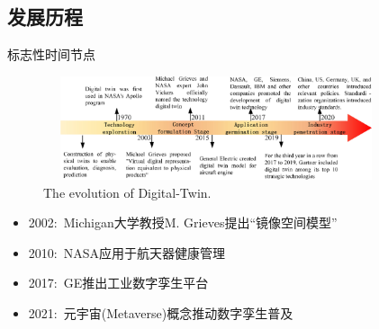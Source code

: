 \subsection{发展历程}
\begin{frame}{标志性时间节点}
\begin{figure}[h!]
\centering
     \includegraphics[height=1.2in, width=4.0in, viewport=0 0 1416 471,clip]{Figures/Evolution_of_Digital-Twin.png}
\caption{\tiny \textrm{The evolution of Digital-Twin.}}%
\label{Fig:Evolution_of_Digital-Twin}
\end{figure}

  \begin{itemize}
	  \item \textrm{2002:~Michigan}大学教授\textrm{M. Grieves}提出``镜像空间模型''
	  \item \textrm{2010:~NASA}应用于航天器健康管理
	  \item \textrm{2017:~GE}推出工业数字孪生平台
	  \item \textrm{2021:~}元宇宙\textrm{(Metaverse)}概念推动数字孪生普及
  \end{itemize}
\end{frame}

